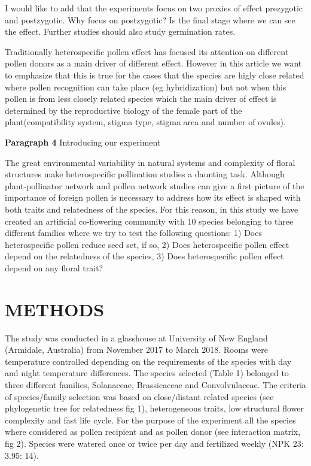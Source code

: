 \documentclass[11pt,a4paper]{article}
\begin{document}
I would like to add that the experiments focus on two proxies of effect
prezygotic and postzygotic. Why focus on postzygotic? Is the final stage
where we can see the effect. Further studies should also study
germination rates.

Traditionally heterospecific pollen effect has focused its attention on
different pollen donors as a main driver of different effect. However in
this article we want to emphasize that this is true for the cases that
the species are higly close related where pollen recognition can take
place (eg hybridization) but not when this pollen is from less closely
related species which the main driver of effect is determined by the
reproductive biology of the female part of the plant(compatibility
system, stigma type, stigma area and number of ovules).

\textbf{Paragraph 4} Introducing our experiment

The great environmental variability in natural systems and complexity of
floral structures make heterospecific pollination studies a daunting
task. Although plant-pollinator network and pollen network studies can
give a first picture of the importance of foreign pollen is necessary to
address how its effect is shaped with both traits and relatedness of the
species. For this reason, in this study we have created an artificial
co-flowering community with 10 species belonging to three different
families where we try to test the following questions: 1) Does
heterospecific pollen reduce seed set, if so, 2) Does heterospecific
pollen effect depend on the relatedness of the species, 3) Does
heterospecific pollen effect depend on any floral trait?

\section{METHODS}\label{methods}

The study was conducted in a glasshouse at University of New England
(Armidale, Australia) from November 2017 to March 2018. Rooms were
temperature controlled depending on the requirements of the species with
day and night temperature differences. The species selected (Table 1)
belonged to three different families, Solanaceae, Brassicaceae and
Convolvulaceae. The criteria of species/family selection was based on
close/distant related species (see phylogenetic tree for relatedness fig
1), heterogeneous traits, low structural flower complexity and fast life
cycle. For the purpose of the experiment all the species where
considered as pollen recipient and as pollen donor (see interaction
matrix, fig 2). Species were watered once or twice per day and
fertilized weekly (NPK 23: 3.95: 14).
\end{document}
